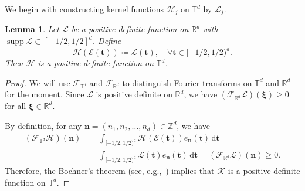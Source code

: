 \documentclass[12pt]{amsart}
\newtheorem{lemma}[theorem]{Lemma}
\theoremstyle{definition}
\theoremstyle{remark}
\newcommand{\bt}{\boldsymbol{t}}
\newcommand{\R}{\mathbb{R}}
\newcommand{\Z}{\mathbb{Z}}
\newcommand{\T}{\mathbb{T}}
\newcommand{\supp}{\operatorname{supp}}
\numberwithin{equation}{section}
\begin{document}
We begin with constructing kernel functions $\mathcal{H}_j$ on $\T^d$ by $\mathcal{L}_j$. 
\begin{lemma}\label{lemma:pd-function-Rd -Td}
	Let $\mathcal{L}$ be a positive definite function on $\R^d$ with $\supp \mathcal{L}\subset [-1/2,1/2]^d$. Define 
	\[
	\mathcal{H}(\mathcal{E}(\bt))\coloneq \mathcal{L}(\bt),\quad \forall \bt\in [-1/2,1/2)^d.
	\]
	 Then $\mathcal{H}$ is a positive definite function on $\T^d$.
\end{lemma}
\begin{proof}
	We will use $\mathcal{F}_{\T^d}$ and $\mathcal{F}_{\R^d}$ to distinguish Fourier transforms on $\T^d$ and $\R^d$ for the moment. Since $\mathcal{L}$ is positive definite on $\R^d$, we have $(\mathcal{F}_{\R^d}\mathcal{L})(\boldsymbol{\xi})\ge 0$ for all $\boldsymbol{\xi}\in \R^d$.
	
	By definition, for any $\boldsymbol{n}=(n_1,n_2,\ldots,n_d)\in \Z^d$, we have
	\begin{align*}
(\mathcal{F}_{\T^d}\mathcal{H})(\boldsymbol{n})&=\int_{[-1/2,1/2)^d}\mathcal{H}(\mathcal{E}(\bt))e_{\boldsymbol{n}}(\bt)\,\mathrm{d}\bt\\
	&=\int_{[-1/2,1/2)^d}\mathcal{L}(\bt)e_{\boldsymbol{n}}(\bt)\,\mathrm{d}\bt=(\mathcal{F}_{\R^d}\mathcal{L})(\boldsymbol{n})\ge 0.
	\end{align*}
	Therefore, the Bochner's theorem (see, e.g.,~\cite[Section~1.4.3]{Rud62}) implies that $\mathcal{K}$ is a positive definite function on $\T^d$.
\end{proof}
\end{document}
